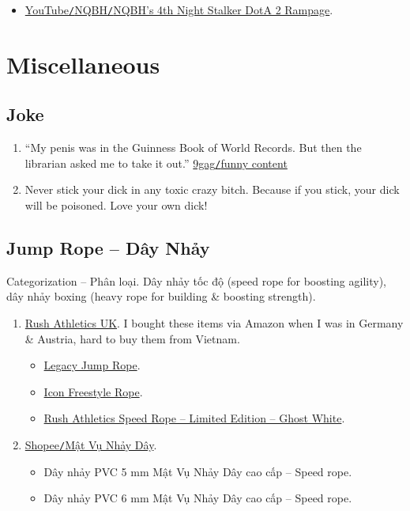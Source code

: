 \documentclass{article}
\begin{document}
\begin{itemize}
	\item \href{https://www.youtube.com/watch?v=d9vmHp-4f3k}{YouTube{\tt/}NQBH{\tt/}NQBH's 4th Night Stalker DotA 2 Rampage}.
\end{itemize}


\section{Miscellaneous}

\subsection{Joke}

\begin{enumerate}
	\item ``My penis was in the Guinness Book of World Records. But then the librarian asked me to take it out.'' \href{https://9gag.com/gag/aPZPm6q}{9gag{\tt/}funny content}
	\item Never stick your dick in any toxic crazy bitch. Because if you stick, your dick will be poisoned. Love your own dick!
\end{enumerate}

\subsection{Jump Rope -- Dây Nhảy}
{\sf Categorization -- Phân loại.} Dây nhảy tốc độ (speed rope for boosting agility), dây nhảy boxing (heavy rope for building \& boosting strength).
\begin{enumerate}
	\item \href{https://www.rushathletics.co.uk}{Rush Athletics UK}. I bought these items via Amazon when I was in Germany \& Austria, hard to buy them from Vietnam.
	\begin{itemize}
		\item \href{https://www.rushathletics.co.uk/collections/ropes/products/legacy-jump-rope}{Legacy Jump Rope}.
		\item \href{https://www.rushathletics.co.uk/collections/ropes/products/icon-freestyle-rope}{Icon Freestyle Rope}.
		\item \href{https://www.rushathletics.co.uk/collections/ropes/products/rush-athletics-speed-rope-ghost-white}{Rush Athletics Speed Rope -- Limited Edition -- Ghost White}.
	\end{itemize}
	\item \href{https://shopee.vn/matvunhayday?categoryId=100637&entryPoint=ShopByPDP&itemId=14803106033}{Shopee{\tt/}Mật Vụ Nhảy Dây}.
	\begin{itemize}
		\item Dây nhảy PVC 5 mm Mật Vụ Nhảy Dây cao cấp -- Speed rope.
		\item Dây nhảy PVC 6 mm Mật Vụ Nhảy Dây cao cấp -- Speed rope.
	\end{itemize}
\end{enumerate}
\end{document}
